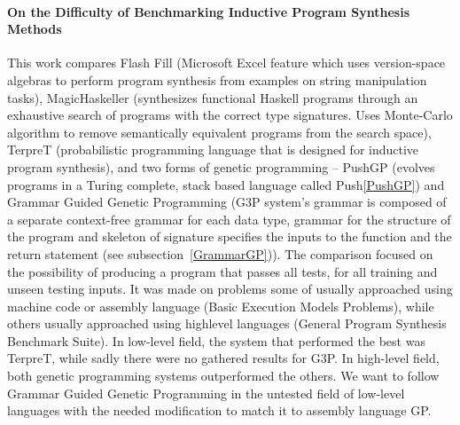 \documentclass[dvipsnames,format=sigconf,anonymous=true,review=true]{acmart}
\begin{document}
\paragraph{On the Difficulty of Benchmarking Inductive Program Synthesis Methods} This work \cite{Pantridge2017On} compares Flash Fill (Microsoft Excel feature which uses version-space algebras to perform program synthesis from examples on string manipulation tasks), MagicHaskeller (synthesizes functional Haskell programs
through an exhaustive search of programs with the correct type signatures. Uses Monte-Carlo algorithm to remove semantically equivalent programs from the search space), TerpreT (probabilistic programming language that is designed for inductive program synthesis), and two forms of genetic programming -- PushGP (evolves programs in a Turing complete, stack based language called Push\autoref{PushGP}) and Grammar Guided Genetic Programming (G3P system’s grammar is composed of a separate context-free grammar for each data type, grammar for the structure of the program and skeleton of signature specifies the inputs to the function and the return statement (see subsection~\autoref{GrammarGP})). The comparison focused on the possibility of producing a program that passes all tests, for all training and unseen testing inputs. It was made on problems some of usually approached using machine code or assembly language (Basic Execution Models Problems), while others usually approached using highlevel languages (General Program Synthesis Benchmark Suite). In low-level field, the system that performed the best was TerpreT, while sadly there were no gathered results for G3P. In high-level field, both genetic programming systems outperformed the others.
We want to follow Grammar Guided Genetic Programming in the untested field of low-level languages with the needed modification to match it to assembly language GP.
\end{document}
